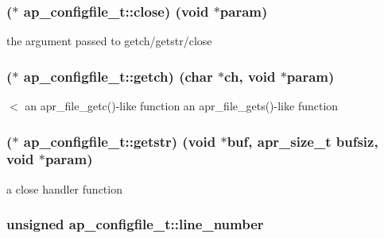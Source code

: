 \subsubsection[{\texorpdfstring{close}{close}}]{($\ast$ ap\+\_\+configfile\+\_\+t\+::close) ({\bf void} $\ast${\bf param})}\hypertarget{structap__configfile__t_acf2316152bf95bdcfbc7abb97a50945c}{}\label{structap__configfile__t_acf2316152bf95bdcfbc7abb97a50945c}
the argument passed to getch/getstr/close 
\subsubsection[{\texorpdfstring{getch}{getch}}]{($\ast$ ap\+\_\+configfile\+\_\+t\+::getch) (char $\ast$ch, {\bf void} $\ast${\bf param})}\hypertarget{structap__configfile__t_a7a23ce815b3569b7e7f3edcbe6db0993}{}\label{structap__configfile__t_a7a23ce815b3569b7e7f3edcbe6db0993}
$<$ an apr\+\_\+file\+\_\+getc()-\/like function an apr\+\_\+file\+\_\+gets()-\/like function 
\subsubsection[{\texorpdfstring{getstr}{getstr}}]{($\ast$ ap\+\_\+configfile\+\_\+t\+::getstr) ({\bf void} $\ast${\bf buf}, {\bf apr\+\_\+size\+\_\+t} {\bf bufsiz}, {\bf void} $\ast${\bf param})}\hypertarget{structap__configfile__t_aec74a3f56170a272f7a3a662aa6aca27}{}\label{structap__configfile__t_aec74a3f56170a272f7a3a662aa6aca27}
a close handler function 
\subsubsection[{\texorpdfstring{line\+\_\+number}{line_number}}]{\setlength{\rightskip}{0pt plus 5cm}unsigned ap\+\_\+configfile\+\_\+t\+::line\+\_\+number}\hypertarget{structap__configfile__t_a8c57bd7a8eb6e2133eba97d4ee08cfdb}{}\label{structap__configfile__t_a8c57bd7a8eb6e2133eba97d4ee08cfdb}
